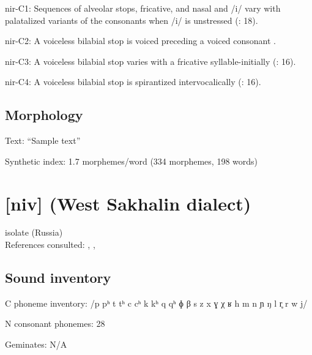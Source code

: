 {\begin{appendixdesc}
\item[nir-C1:] Sequences of alveolar stops, fricative, and nasal and /i/ vary with palatalized variants of the consonants when /i/ is unstressed (\citealt{MayMay1981}: 18).

\item[nir-C2:] A voiceless bilabial stop is voiced preceding a voiced consonant \citep[30]{May1997}.

\item[nir-C3:] A voiceless bilabial stop varies with a fricative syllable-initially (\citealt{MayMay1981}: 16).

\item[nir-C4:] A voiceless bilabial stop is spirantized intervocalically (\citealt{MayMay1981}: 16).
\end{appendixdesc}
\subsection*{Morphology}

\begin{appendixdesc}

\item[Text:] “Sample text” \citep[172--177]{May1997}

\item[Synthetic index:] 1.7 morphemes/word (334 morphemes, 198 words)
\end{appendixdesc}
\section*{[niv]  (West Sakhalin dialect)}  %
isolate (Russia)\medskip\\
References consulted: \citet{Gruzdeva1998}, \citet{Kreinovich1979}, \citet{Shiraishi2006}

\subsection*{Sound inventory}
\begin{appendixdesc}

\item[C phoneme inventory:] /p pʰ t tʰ c cʰ k kʰ q qʰ ɸ β s z x ɣ χ ʁ h m n ɲ ŋ l r̥ r w j/

\item[N consonant phonemes:] 28

\item[Geminates:] N/A


\end{appendixdesc}}
